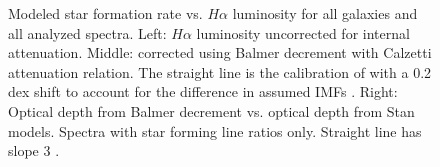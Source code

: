 \documentclass[modern]{aastex62}
\begin{document}
\begin{figure}
\hfill
{}
\caption{Modeled star formation rate vs. $H\alpha$ luminosity for all galaxies and all analyzed spectra. Left: $H\alpha$ luminosity uncorrected for internal attenuation. Middle: corrected using Balmer decrement with Calzetti attenuation relation. The straight line is the calibration of \citet{2006ApJ...642..775M} with a 0.2 dex shift to account for the difference in assumed IMFs \citep{2011ApJ...737...67M}. Right: Optical depth from Balmer decrement vs. optical depth from Stan models. Spectra with star forming line ratios only. Straight line has slope 3 \citep{2000ApJ...539..718C}.}
\label{fig:sfrha}
\end{figure}
\end{document}
